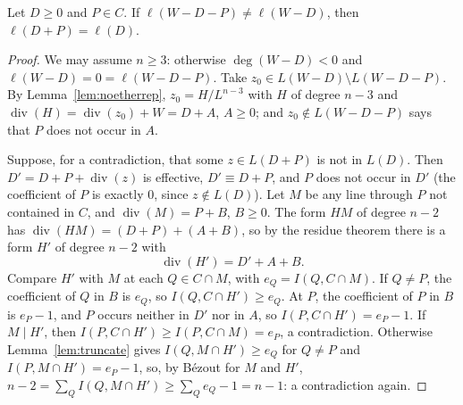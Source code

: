 \begin{lemma}\label{lem:reduction}
Let $D\ge0$ and $P\in C$. If $\ell(W-D-P)\ne\ell(W-D)$, then $\ell(D+P)=\ell(D)$.
\end{lemma}
\begin{proof}
We may assume $n\ge3$: otherwise $\deg(W-D)<0$ and $\ell(W-D)=0=\ell(W-D-P)$. Take $z_0\in L(W-D)\setminus L(W-D-P)$. By Lemma~\ref{lem:noetherrep},
$z_0=H/L^{n-3}$ with $H$ of degree $n-3$ and $\operatorname{div}(H)=\operatorname{div}(z_0)+W=D+A$, $A\ge0$; and $z_0\notin L(W-D-P)$ says that $P$ does
not occur in $A$.

Suppose, for a contradiction, that some $z\in L(D+P)$ is not in $L(D)$. Then $D'=D+P+\operatorname{div}(z)$ is effective, $D'\equiv D+P$, and $P$ does not
occur in $D'$ (the coefficient of $P$ is exactly $0$, since $z\notin L(D)$). Let $M$ be any line through $P$ not contained in $C$, and
$\operatorname{div}(M)=P+B$, $B\ge0$. The form $HM$ of degree $n-2$ has $\operatorname{div}(HM)=(D+P)+(A+B)$, so by the residue theorem there is a form
$H'$ of degree $n-2$ with
\[
\operatorname{div}(H')=D'+A+B.
\]
Compare $H'$ with $M$ at each $Q\in C\cap M$, with $e_Q=I(Q,C\cap M)$. If $Q\ne P$, the coefficient of $Q$ in $B$ is $e_Q$, so
$I(Q,C\cap H')\ge e_Q$. At $P$, the coefficient of $P$ in $B$ is $e_P-1$, and $P$ occurs neither in $D'$ nor in $A$, so $I(P,C\cap H')=e_P-1$. If $M\mid H'$,
then $I(P,C\cap H')\ge I(P,C\cap M)=e_P$, a contradiction. Otherwise Lemma~\ref{lem:truncate} gives $I(Q,M\cap H')\ge e_Q$ for $Q\ne P$ and
$I(P,M\cap H')=e_P-1$, so, by B\'ezout for $M$ and $H'$, $n-2=\sum_QI(Q,M\cap H')\ge\sum_Qe_Q-1=n-1$: a contradiction again.
\end{proof}

